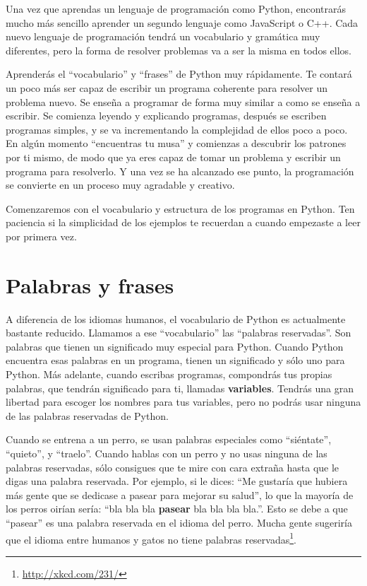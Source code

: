 Una vez que aprendas un lenguaje de programación como Python, encontrarás
mucho más sencillo aprender un segundo lenguaje como JavaScript o C++.
Cada nuevo lenguaje de programación tendrá un vocabulario y gramática muy
diferentes, pero la forma de resolver problemas
va a ser la misma en todos ellos.

Aprenderás el ``vocabulario'' y ``frases'' de Python muy rápidamente.
Te contará un poco más ser capaz de escribir un programa coherente
para resolver un problema nuevo. Se enseña a programar de forma muy similar
a como se enseña a escribir. Se comienza leyendo y explicando programas,
después se escriben programas simples, y se va incrementando la complejidad
de ellos poco a poco. En algún momento ``encuentras tu musa'' y comienzas
a descubrir los patrones por ti mismo, de modo que ya eres capaz de tomar un
problema y escribir un programa para resolverlo. Y una vez se ha alcanzado ese
punto, la programación se convierte en un proceso muy agradable y creativo.

Comenzaremos con el vocabulario y estructura de los programas en Python. Ten
paciencia si la simplicidad de los ejemplos te recuerdan a cuando empezaste
a leer por primera vez.

\section{Palabras y frases}

A diferencia de los idiomas humanos, el vocabulario de Python es actualmente
bastante reducido. Llamamos a ese ``vocabulario'' las ``palabras reservadas''.
Son palabras que tienen un significado muy especial para Python. Cuando Python
encuentra esas palabras en un programa, tienen un significado y sólo uno para \mbox{Python}.
Más adelante, cuando escribas programas, compondrás tus propias palabras, que tendrán significado para ti, llamadas {\bf variables}. Tendrás una gran libertad para escoger los nombres para tus variables, pero no podrás usar ninguna de las palabras reservadas de Python.

Cuando se entrena a un perro, se usan palabras especiales como
``siéntate'', ``quieto'', y ``traelo''. Cuando hablas con un perro y
no usas ninguna de las palabras reservadas, sólo consigues que te mire
con cara extraña hasta que le digas una palabra reservada.
Por ejemplo, si le dices:
``Me gustaría que hubiera más gente que se dedicase a pasear para mejorar su salud'',
lo que la mayoría de los perros oirían sería:
``bla bla bla {\bf pasear} bla bla bla bla.''.
Esto se debe a que ``pasear'' es una palabra reservada en el idioma del perro.
Mucha gente sugeriría que el idioma entre humanos y gatos no tiene
palabras reservadas\footnote{\url{http://xkcd.com/231/}}.

